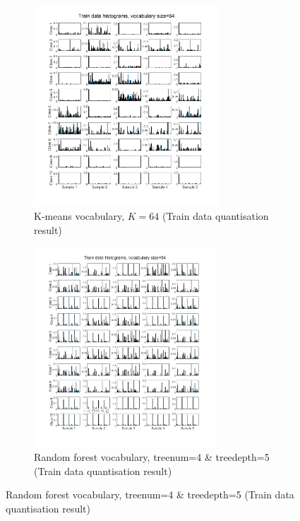 \label{subsec:Q3-app2}
\begin{figure}[htbp]
	\centering
	\begin{subfigure}[t]{0.5\linewidth}
		\centering
		\includegraphics[height=7.5cm]{image/q1-appendix/train_64.png} 
		\caption{K-means vocabulary, $K=64$ (Train data quantisation result)}
	\end{subfigure}%
	\hfill
	\begin{subfigure}[t]{0.5\linewidth}
		\centering
		\includegraphics[height=7.5cm]{image/q3-appendix/RFtrain-64.png}
		\caption{Random forest vocabulary, treenum=4 \& treedepth=5 (Train data quantisation result)}
	\end{subfigure}
	

\end{figure}

